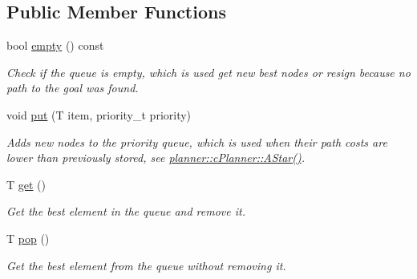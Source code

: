 \subsection*{Public Member Functions}
\begin{DoxyCompactItemize}
\item 
\mbox{\label{structplanner_1_1_priority_queue_a459a18939cb4b02517d5a7db19fd829c}} 
bool \mbox{\hyperlink{structplanner_1_1_priority_queue_a459a18939cb4b02517d5a7db19fd829c}{empty}} () const
\begin{DoxyCompactList}\small\item\em Check if the queue is empty, which is used get new best nodes or resign because no path to the goal was found. \end{DoxyCompactList}\item 
\mbox{\label{structplanner_1_1_priority_queue_afb6cb790e6a592d22a2f05441bfbf23b}} 
void \mbox{\hyperlink{structplanner_1_1_priority_queue_afb6cb790e6a592d22a2f05441bfbf23b}{put}} (T item, priority\+\_\+t priority)
\begin{DoxyCompactList}\small\item\em Adds new nodes to the priority queue, which is used when their path costs are lower than previously stored, see \mbox{\hyperlink{classplanner_1_1c_planner_a341e70531266f023ac9461d18979d1ef}{planner\+::c\+Planner\+::\+A\+Star()}}. \end{DoxyCompactList}\item 
\mbox{\label{structplanner_1_1_priority_queue_abdd3d392da157bb645b5720eace1200a}} 
T \mbox{\hyperlink{structplanner_1_1_priority_queue_abdd3d392da157bb645b5720eace1200a}{get}} ()
\begin{DoxyCompactList}\small\item\em Get the best element in the queue and remove it. \end{DoxyCompactList}\item 
\mbox{\label{structplanner_1_1_priority_queue_abba3d8fcc5729acc424b1fbc38c94e84}} 
T \mbox{\hyperlink{structplanner_1_1_priority_queue_abba3d8fcc5729acc424b1fbc38c94e84}{pop}} ()
\begin{DoxyCompactList}\small\item\em Get the best element from the queue without removing it. \end{DoxyCompactList}\item 

\end{DoxyCompactItemize}
